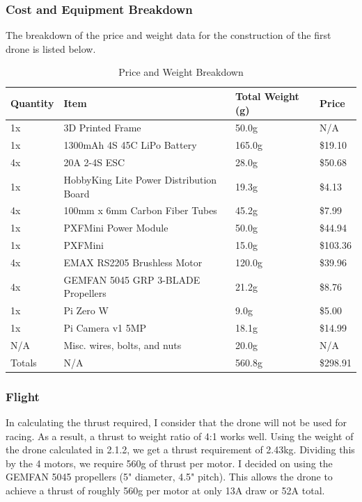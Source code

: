 \documentclass{article}
\begin{document}
\subsubsection{Cost and Equipment Breakdown}
The breakdown of the price and weight data for the construction of the first drone is listed below.
\begin{table}[h!]
\centering
\begin{tabular}{|l|l|l|l|}
\hline
Quantity & Item                                    & Total Weight (g) & Price    \\ \hline
1x       & 3D Printed Frame                        & 50.0g            & N/A      \\ \hline
1x       & 1300mAh 4S 45C LiPo Battery             & 165.0g           & \$19.10  \\ \hline
4x       & 20A 2-4S ESC                            & 28.0g            & \$50.68  \\ \hline
1x       & HobbyKing Lite Power Distribution Board & 19.3g            & \$4.13   \\ \hline
4x       & 100mm x 6mm Carbon Fiber Tubes          & 45.2g            & \$7.99   \\ \hline
1x       & PXFMini Power Module                    & 50.0g            & \$44.94  \\ \hline
1x       & PXFMini                                 & 15.0g            & \$103.36 \\ \hline
4x       & EMAX RS2205 Brushless Motor             & 120.0g           & \$39.96  \\ \hline
4x       & GEMFAN 5045 GRP 3-BLADE Propellers      & 21.2g            & \$8.76   \\ \hline
1x       & Pi Zero W                               & 9.0g             & \$5.00   \\ \hline
1x       & Pi Camera v1 5MP                        & 18.1g            & \$14.99  \\ \hline
N/A      & Misc. wires, bolts, and nuts            & 20.0g            & N/A      \\ \hline
Totals   & N/A                                     & 560.8g           & \$298.91 \\ \hline
\end{tabular}
\caption{Price and Weight Breakdown}
\end{table}

\subsubsection{Flight}
In calculating the thrust required, I consider that the drone will not be used for racing. As a result, a thrust to weight ratio of 4:1 works well. Using the weight of the drone calculated in 2.1.2, we get a thrust requirement of 2.43kg. Dividing this by the 4 motors, we require 560g of thrust per motor. I decided on using the GEMFAN 5045 propellers (5" diameter, 4.5" pitch). This allows the drone to achieve a thrust of roughly 560g per motor at only 13A draw or 52A total. 
\end{document}
